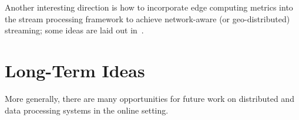 

Another interesting direction is how to incorporate edge computing metrics into the stream processing framework to achieve network-aware (or geo-distributed) streaming; some ideas are laid out in~.

\section{Long-Term Ideas}

More generally, there are many opportunities for future work on distributed and data processing systems in the online setting.

